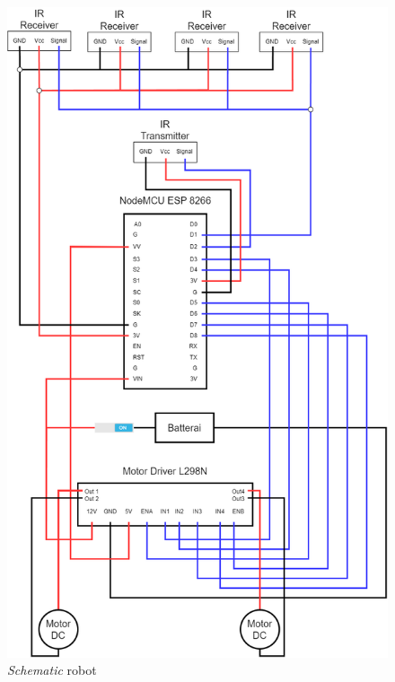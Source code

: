 \begin{figure}[H]
  \centering
  \includegraphics[width=0.6\linewidth]{../Gambar/schematic.png}
  \caption{\emph{Schematic} robot}
  \label{fig:schematic}
\end{figure}

